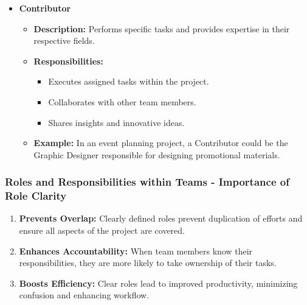 \documentclass[aspectratio=169]{beamer}
\begin{document}
\begin{frame}[fragile]
\begin{itemize}
        \item \textbf{Contributor}
            \begin{itemize}
                \item \textbf{Description:} Performs specific tasks and provides expertise in their respective fields.
                \item \textbf{Responsibilities:}
                    \begin{itemize}
                        \item Executes assigned tasks within the project.
                        \item Collaborates with other team members.
                        \item Shares insights and innovative ideas.
                    \end{itemize}
                \item \textbf{Example:} In an event planning project, a Contributor could be the Graphic Designer responsible for designing promotional materials.
            \end{itemize}
    \end{itemize}
\end{frame}

\begin{frame}[fragile]
    \frametitle{Roles and Responsibilities within Teams - Importance of Role Clarity}
    \begin{enumerate}
        \item \textbf{Prevents Overlap:} Clearly defined roles prevent duplication of efforts and ensure all aspects of the project are covered.
        \item \textbf{Enhances Accountability:} When team members know their responsibilities, they are more likely to take ownership of their tasks.
        \item \textbf{Boosts Efficiency:} Clear roles lead to improved productivity, minimizing confusion and enhancing workflow.
    \end{enumerate}
\end{frame}
\end{document}

